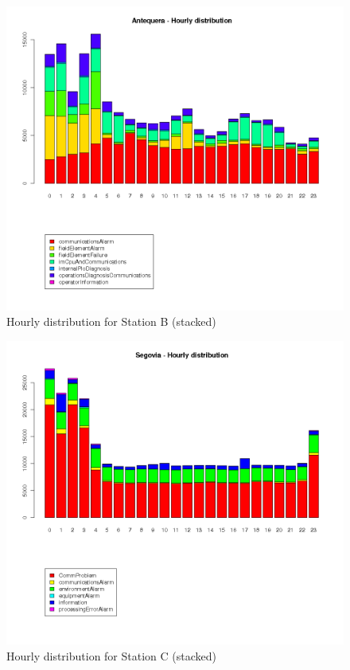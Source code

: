 \begin{figure}[htb]
 \centering
 \includegraphics[width=\textwidth]{./img/antequera_timeline.png}
 \caption{Hourly distribution for Station B (stacked)} \label{fig:antequera_timeline}
\end{figure}
\begin{figure}[htb]
 \centering
 \includegraphics[width=\textwidth]{./img/segovia_timeline.png}
 \caption{Hourly distribution for Station C (stacked)} \label{fig:segovia_timeline}
\end{figure}
